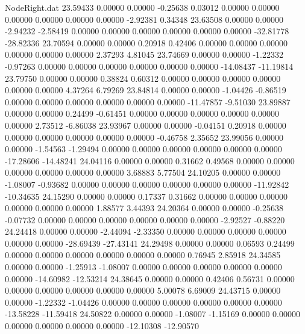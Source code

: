 \begin{filecontents}{NodeRight.dat}
  23.59433    0.00000    0.00000    -0.25638    0.03012    0.00000    0.00000    0.00000    0.00000    0.00000    0.00000   -2.92381    0.34348
  23.63508    0.00000    0.00000    -2.94232   -2.58419    0.00000    0.00000    0.00000    0.00000    0.00000    0.00000  -32.81778  -28.82336
  23.70594    0.00000    0.00000     0.20918    0.42406    0.00000    0.00000    0.00000    0.00000    0.00000    0.00000    2.37293    4.81045
  23.74669    0.00000    0.00000    -1.22332   -0.97263    0.00000    0.00000    0.00000    0.00000    0.00000    0.00000  -14.08437  -11.19814
  23.79750    0.00000    0.00000     0.38824    0.60312    0.00000    0.00000    0.00000    0.00000    0.00000    0.00000    4.37264    6.79269
  23.84814    0.00000    0.00000    -1.04426   -0.86519    0.00000    0.00000    0.00000    0.00000    0.00000    0.00000  -11.47857   -9.51030
  23.89887    0.00000    0.00000     0.24499   -0.61451    0.00000    0.00000    0.00000    0.00000    0.00000    0.00000    2.73512   -6.86038
  23.93967    0.00000    0.00000    -0.04151    0.20918    0.00000    0.00000    0.00000    0.00000    0.00000    0.00000   -0.46758    2.35652
  23.99056    0.00000    0.00000    -1.54563   -1.29494    0.00000    0.00000    0.00000    0.00000    0.00000    0.00000  -17.28606  -14.48241
  24.04116    0.00000    0.00000     0.31662    0.49568    0.00000    0.00000    0.00000    0.00000    0.00000    0.00000    3.68883    5.77504
  24.10205    0.00000    0.00000    -1.08007   -0.93682    0.00000    0.00000    0.00000    0.00000    0.00000    0.00000  -11.92842  -10.34635
  24.15290    0.00000    0.00000     0.17337    0.31662    0.00000    0.00000    0.00000    0.00000    0.00000    0.00000    1.88577    3.44393
  24.20364    0.00000    0.00000    -0.25638   -0.07732    0.00000    0.00000    0.00000    0.00000    0.00000    0.00000   -2.92527   -0.88220
  24.24418    0.00000    0.00000    -2.44094   -2.33350    0.00000    0.00000    0.00000    0.00000    0.00000    0.00000  -28.69439  -27.43141
  24.29498    0.00000    0.00000     0.06593    0.24499    0.00000    0.00000    0.00000    0.00000    0.00000    0.00000    0.76945    2.85918
  24.34585    0.00000    0.00000    -1.25913   -1.08007    0.00000    0.00000    0.00000    0.00000    0.00000    0.00000  -14.60982  -12.53214
  24.38645    0.00000    0.00000     0.42406    0.56731    0.00000    0.00000    0.00000    0.00000    0.00000    0.00000    5.00078    6.69009
  24.43715    0.00000    0.00000    -1.22332   -1.04426    0.00000    0.00000    0.00000    0.00000    0.00000    0.00000  -13.58228  -11.59418
  24.50822    0.00000    0.00000    -1.08007   -1.15169    0.00000    0.00000    0.00000    0.00000    0.00000    0.00000  -12.10308  -12.90570

\end{filecontents}
